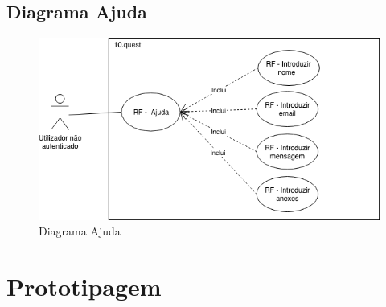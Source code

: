 \newpage

\subsection{Diagrama Ajuda}
\label{d:ajuda}
\begin{figure}[ht!]
	\begin{center}
		\includegraphics[width=1\textwidth]{img/rf/ajuda}
		\caption{Diagrama Ajuda}
		\label{fig:rf-ajuda}
	\end{center}
\end{figure}




\newpage
\section{Prototipagem}
\label{prototipagem}


\blankpage

\glsresetall